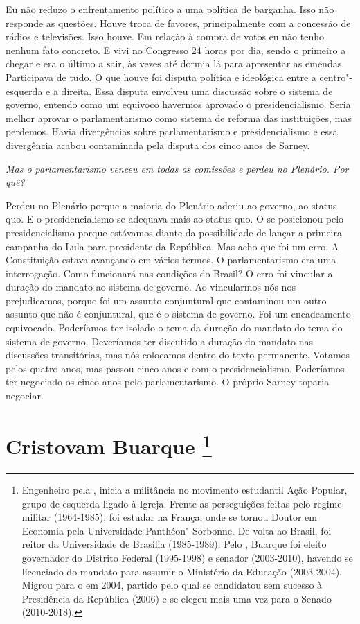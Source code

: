 Eu não reduzo o enfrentamento político a uma política
de barganha. Isso não responde as questões. Houve troca de favores,
principalmente com a concessão de rádios e televisões. Isso houve. Em
relação à compra de votos eu não tenho nenhum fato concreto. E vivi no
Congresso 24 horas por dia, sendo o primeiro a chegar e era o último a
sair, às vezes até dormia lá para apresentar as emendas. Participava de
tudo. O que houve foi disputa política e ideológica entre a
centro"-esquerda e a direita. Essa disputa envolveu uma discussão sobre o
sistema de governo, entendo como um equivoco havermos aprovado o
presidencialismo. Seria melhor aprovar o parlamentarismo como sistema de
reforma das instituições, mas perdemos. Havia divergências sobre
parlamentarismo e presidencialismo e essa divergência acabou contaminada
pela disputa dos cinco anos de Sarney.

\medskip

\noindent\emph{Mas o parlamentarismo venceu em todas as comissões e perdeu no
Plenário. Por quê?}

Perdeu no Plenário porque a maioria do Plenário aderiu
ao governo, ao status quo. E o presidencialismo se adequava mais ao
status quo. O  se posicionou pelo presidencialismo porque estávamos
diante da possibilidade de lançar a primeira campanha do Lula para
presidente da República. Mas acho que foi um erro. A Constituição estava
avançando em vários termos. O parlamentarismo era uma interrogação. Como
funcionará nas condições do Brasil? O erro foi vincular a duração do
mandato ao sistema de governo. Ao vincularmos nós nos prejudicamos,
porque foi um assunto conjuntural que contaminou um outro assunto que
não é conjuntural, que é o sistema de governo. Foi um encadeamento
equivocado. Poderíamos ter isolado o tema da duração do mandato do tema
do sistema de governo. Deveríamos ter discutido a duração do mandato nas
discussões transitórias, mas nós colocamos dentro do texto permanente.
Votamos pelos quatro anos, mas passou cinco anos e com o
presidencialismo. Poderíamos ter negociado os cinco anos pelo
parlamentarismo. O próprio Sarney toparia negociar.

\chapter{Cristovam Buarque
\footnote{Engenheiro pela , inicia a militância no movimento estudantil Ação
Popular, grupo de esquerda ligado à Igreja. Frente as perseguições
feitas pelo regime militar (1964-1985), foi estudar na França, onde se
tornou Doutor em Economia pela Universidade Panthéon"-Sorbonne. De volta
ao Brasil, foi reitor da Universidade de Brasília (1985-1989). Pelo ,
Buarque foi eleito governador do Distrito Federal (1995-1998) e senador
(2003-2010), havendo se licenciado do mandato para assumir o Ministério
da Educação (2003-2004). Migrou para o  em 2004, partido pelo qual se
candidatou sem sucesso à Presidência da República (2006) e se elegeu
mais uma vez para o Senado (2010-2018).}}

